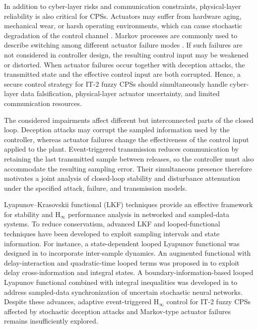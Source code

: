 \documentclass[preprint,review,fleqn,sort&compress,3p]{elsarticle}
\theoremstyle{definition} %
\theoremstyle{definition}%
\begin{document}
In addition to cyber-layer risks and communication constraints, physical-layer
reliability is also critical for CPSs. Actuators may suffer from hardware aging,
mechanical wear, or harsh operating environments, which can cause stochastic
degradation of the control channel
\cite{chenProbabilisticEventTriggeredPolicy2023,caiAdaptiveFaulttolerantControl2025}.
Markov processes are commonly used to describe switching among different actuator
failure modes \cite{yaoMultiSensorBasedSwitchingEventTriggered2024,xuAsynchronousEventTriggeredControl2024}.
If such failures are not considered in controller design, the resulting control
input may be weakened or distorted. When actuator failures occur together with
deception attacks, the
transmitted state and the effective control input are both corrupted. Hence, a
secure control strategy for IT-2 fuzzy CPSs should simultaneously handle
cyber-layer data falsification, physical-layer actuator uncertainty, and limited
communication resources.

The considered impairments affect different but interconnected parts of the closed loop. Deception attacks may corrupt the sampled information used by the controller, whereas actuator failures change the effectiveness of the control input applied to the plant. Event-triggered transmission reduces communication by retaining the last transmitted sample between releases, so the controller must also accommodate the resulting sampling error. Their simultaneous presence therefore motivates a joint analysis of closed-loop stability and disturbance attenuation under the specified attack, failure, and transmission models.

Lyapunov--Krasovskii functional (LKF) techniques provide an effective framework for stability and $\mathrm{H}_\infty$ performance analysis in networked and sampled-data systems. To reduce conservatism, advanced LKF and looped-functional techniques
have been developed to exploit sampling intervals and state information. For
instance, a state-dependent looped Lyapunov functional was designed in
\cite{lianNewResultsStability2020} to incorporate inter-sample dynamics. An
augmented functional with delay-interaction and quadratic-time looped terms was
proposed in \cite{zhangMixedDelayBasedAugmentedFunctional2024} to exploit delay
cross-information and integral states. A boundary-information-based looped
Lyapunov functional combined with integral inequalities was developed in
\cite{ganesanSynchronizationStochasticNeural2024} to address sampled-data synchronization of uncertain stochastic neural networks. Despite these advances, adaptive event-triggered $\mathrm{H}_\infty$ control for IT-2 fuzzy CPSs affected by stochastic deception attacks and Markov-type actuator failures remains insufficiently explored.
\end{document}
